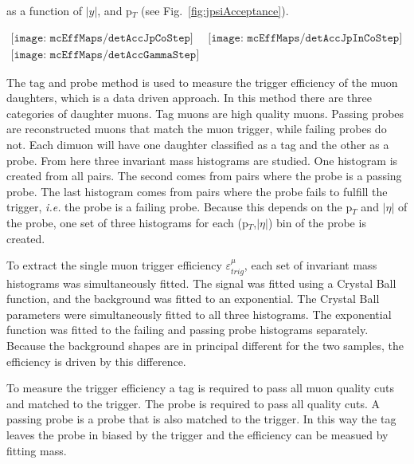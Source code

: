         as a function of $|y|$, and p$_{T}$ (see Fig.~\ref{fig:jpsiAcceptance}).
        \begin{figure*}[!Hhtb]
          \centering
          $ \begin{array}{cc}
            \texttt{[image: mcEffMaps/detAccJpCoStep]} &
            \texttt{[image: mcEffMaps/detAccJpInCoStep]} \\
            \texttt{[image: mcEffMaps/detAccGammaStep]}
          \end{array} $
          \caption{Dimuon acceptance from coherent J/$\psi$ (top left), incoherent 
            J$\psi$ (top right), and photon-photon interactions (lower).}
          \label{fig:jpsiAcceptance}
        \end{figure*}

      The tag and probe method is used to measure the trigger efficiency of 
        the muon daughters, which is a data driven approach. 
      In this method there are three categories of daughter muons. 
      Tag muons are high quality muons.
      Passing probes are reconstructed muons that match the muon trigger, 
        while failing probes do not. 
      Each dimuon will have one daughter classified as a tag and the other
        as a probe.
      From here three invariant mass histograms are studied. 
      One histogram is created from all pairs. 
      The second comes from pairs where the probe is a passing probe.  
      The last histogram comes from pairs where the probe fails to fulfill
        the trigger, \textit{i.e.} the probe is a failing probe. 
      Because this depends on the p$_{T}$ and $|\eta|$ of the probe, one set 
        of three histograms for each (p$_{T}$,$|\eta|$) bin of the probe is 
        created.

      To extract the single muon trigger efficiency $\varepsilon^{\mu}_{trig}$, 
        each set of invariant mass histograms was simultaneously fitted. 
      The signal was fitted using a Crystal Ball function, and the background 
        was fitted to an exponential.
      The Crystal Ball parameters were simultaneously fitted to all three 
        histograms.
      The exponential function was fitted to the failing and passing probe 
        histograms separately.
      Because the background shapes are in principal different for the two 
        samples, the efficiency is driven by this difference. 

      To measure the trigger efficiency a tag is required to pass all muon
        quality cuts and matched to the trigger.
      The probe is required to pass all quality cuts. 
      A passing probe is a probe that is also matched to the trigger. 
      In this way the tag leaves the probe in biased by the trigger and the 
        efficiency can be measued by fitting mass.  

